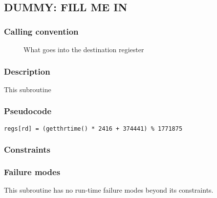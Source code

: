 \clearpage
{}
{}
\label{insn:dummy}
\subsection*{DUMMY: FILL ME IN}

\subsubsection*{Calling convention}

\begin{description}
\item[] What goes into the destination regiester
\end{description}

\subsubsection*{Description}

This subroutine 
\subsubsection*{Pseudocode}

\begin{verbatim}
regs[rd] = (getthrtime() * 2416 + 374441) % 1771875
\end{verbatim}

\subsubsection*{Constraints}

\subsubsection*{Failure modes}

This subroutine has no run-time failure modes beyond its constraints.
